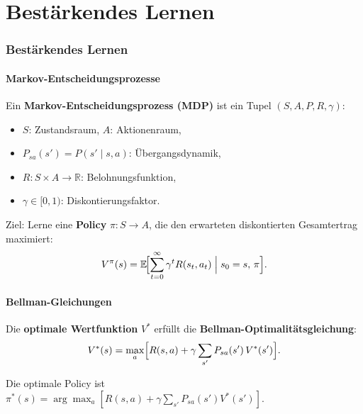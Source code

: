 \documentclass[11pt]{article}
\theoremstyle{csthm}
\theoremstyle{csdef}
\newcommand{\R}{\mathbb{R}}
\newcommand{\E}{\mathbb{E}}
\begin{document}
\newpage
\part{Bestärkendes Lernen}

\section{Bestärkendes Lernen}

\subsection{Markov-Entscheidungsprozesse}

Ein \textbf{Markov-Entscheidungsprozess (MDP)} ist ein Tupel
$(S, A, P, R, \gamma)$:
\begin{itemize}
  \item $S$: Zustandsraum, $A$: Aktionenraum,
  \item $P_{sa}(s') = P(s' \mid s, a)$: Übergangsdynamik,
  \item $R : S \times A \to \R$: Belohnungsfunktion,
  \item $\gamma \in [0,1)$: Diskontierungsfaktor.
\end{itemize}

Ziel: Lerne eine \textbf{Policy} $\pi : S \to A$, die den erwarteten
diskontierten Gesamtertrag maximiert:
\begin{equation}
  V^\pi(s) = \E\!\Bigl[\sum_{t=0}^\infty \gamma^t R(s_t, a_t)
    \;\Big|\; s_0 = s,\, \pi\Bigr].
\end{equation}

\subsection{Bellman-Gleichungen}

Die \textbf{optimale Wertfunktion} $V^*$ erfüllt die
\textbf{Bellman-Optimalitätsgleichung}:
\begin{equation}
  V^*(s) = \max_a \Bigl[R(s,a) + \gamma \sum_{s'} P_{sa}(s')\,V^*(s')\Bigr].
\end{equation}

Die optimale Policy ist $\pi^*(s) = \arg\max_a [R(s,a) + \gamma \sum_{s'}
P_{sa}(s') V^*(s')]$.
\end{document}
